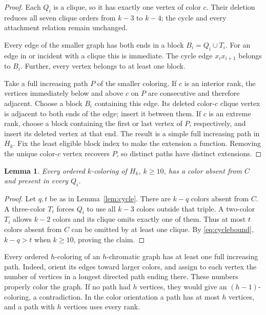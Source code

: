 \documentclass[11pt]{amsart}
\newtheorem{lemma}[theorem]{Lemma}
\begin{document}
\begin{proof}
Each $Q_i$ is a clique, so it has exactly one vertex of color $c$.
Their deletion reduces all seven clique orders from $k-3$ to $k-4$;
the cycle and every attachment relation remain unchanged.

Every edge of the smaller graph has both ends in a block
$B_i=Q_i\cup T_i$.  For an edge in or incident with a clique this is
immediate.  The cycle edge $x_ix_{i+1}$ belongs to $B_i$.  Further,
every vertex belongs to at least one block.

Take a full increasing path $P$ of the smaller coloring.  If $c$ is
an interior rank, the vertices immediately below and above $c$ on
$P$ are consecutive and therefore adjacent.  Choose a block $B_i$
containing this edge.  Its deleted color-$c$ clique vertex is adjacent
to both ends of the edge; insert it between them.  If $c$ is an
extreme rank, choose a block containing the first or last vertex of
$P$, respectively, and insert its deleted vertex at that end.  The
result is a simple full increasing path in $H_k$.  Fix the least
eligible block index to make the extension a function.  Removing the
unique color-$c$ vertex recovers $P$, so distinct paths have distinct
extensions.
\end{proof}

\begin{lemma}\label{lem:common}
Every ordered $k$-coloring of $H_k$, $k\geq10$, has a color absent from
$C$ and present in every $Q_i$.
\end{lemma}

\begin{proof}
Let $q,t$ be as in Lemma~\ref{lem:cycle}.  There are $k-q$ colors
absent from $C$.  A three-color $T_i$ forces $Q_i$ to use all $k-3$
colors outside that triple.  A two-color $T_i$ allows $k-2$ colors
and its clique omits exactly one of them.  Thus at most $t$ colors
absent from $C$ can be omitted by at least one clique.  By
\eqref{eq:cyclebound}, $k-q>t$ when $k\geq10$, proving the claim.
\end{proof}

Every ordered $h$-coloring of an $h$-chromatic graph has at least one
full increasing path.  Indeed, orient its edges toward larger colors,
and assign to each vertex the number of vertices in a longest directed
path ending there.  These numbers properly color the graph.  If no
path had $h$ vertices, they would give an $(h-1)$-coloring, a
contradiction.  In the color orientation a path has at most $h$
vertices, and a path with $h$ vertices uses every rank.
\end{document}
